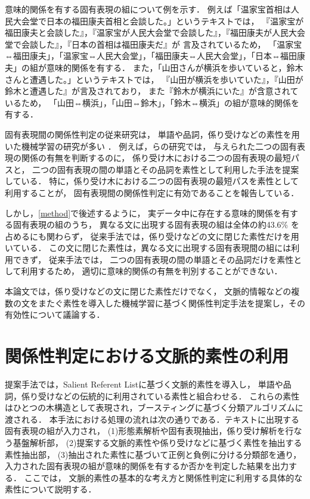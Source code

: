 \documentclass[japanese]{jnlp_1.4}
\begin{document}
意味的関係を有する固有表現の組について例を示す．
例えば「温家宝首相は人民大会堂で日本の福田康夫首相と会談した。」というテキストでは，
『温家宝が福田康夫と会談した』，『温家宝が人民大会堂で会談した』，『福田康夫が人民大会堂で会談した』，『日本の首相は福田康夫だ』が
言及されているため，
「温家宝⇔福田康夫」，「温家宝⇔人民大会堂」，「福田康夫⇔人民大会堂」，「日本⇔福田康夫」の組が意味的関係を有する．
また，「山田さんが横浜を歩いていると，鈴木さんと遭遇した。」というテキストでは，
『山田が横浜を歩いていた』，『山田が鈴木と遭遇した』が言及されており，
また『鈴木が横浜にいた』が含意されているため，
「山田⇔横浜」，「山田⇔鈴木」，「鈴木⇔横浜」の組が意味的関係を有する．

固有表現間の関係性判定の従来研究は，
単語や品詞，係り受けなどの素性を用いた機械学習の研究が多い
\cite{culotta2004dtk,kambhatla2004cls,zelenko2003kmr}．
例えば，らの研究では，
与えられた二つの固有表現の関係の有無を判断するのに，
係り受け木における二つの固有表現の最短パスと，
二つの固有表現の間の単語とその品詞を素性として利用した手法を提案している．
特に，係り受け木における二つの固有表現の最短パスを素性として利用することが，
固有表現間の関係性判定に有効であることを報告している．

しかし，{\ref{method}}で後述するように，
実データ中に存在する意味的関係を有する固有表現の組のうち，
異なる文に出現する固有表現の組は全体の約43.6\% を占めるにも関わらず，
従来手法では，係り受けなどの文に閉じた素性だけを用いている．
この文に閉じた素性は，異なる文に出現する固有表現間の組には利用できず，
従来手法では，
二つの固有表現の間の単語とその品詞だけを素性として利用するため，
適切に意味的関係の有無を判別することができない．

本論文では，係り受けなどの文に閉じた素性だけでなく，
文脈的情報などの複数の文をまたぐ素性を導入した機械学習に基づく関係性判定手法を提案し，その有効性について議論する．

\section{関係性判定における文脈的素性の利用}
\label{teian}

提案手法では，Salient Referent List\cite{nariyama2002ger}に基づく文脈的素性を導入し，
単語や品詞，係り受けなどの伝統的に利用されている素性と組合わせる．
これらの素性はひとつの木構造として表現され，ブースティングに基づく分類アルゴリズムに渡される．
本手法における処理の流れは次の通りである．テキストに出現する固有表現の組が入力され，
(1)形態素解析や固有表現抽出，係り受け解析を行なう基盤解析部，
(2)提案する文脈的素性や係り受けなどに基づく素性を抽出する素性抽出部，
(3)抽出された素性に基づいて正例と負例に分ける分類部を通り，
入力された固有表現の組が意味的関係を有するか否かを判定した結果を出力する．
ここでは，
文脈的素性の基本的な考え方と関係性判定に利用する具体的な素性について説明する．
\end{document}
